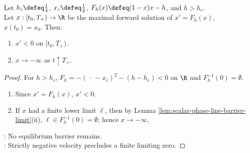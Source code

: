 \begin{theorem} \label{thm:supercritical-harvest-phase-line} \\
Let $h_c\defeq\frac14$, $x_c\defeq\frac12$, $F_h(x)\defeq(1-x)x-h$, and $h>h_c$.\\
Let $x:[t_0,T_+)\to\R$ be the maximal forward solution of $x'=F_h(x)$, $x(t_0)=x_0$. Then:
\begin{enumerate}[label=(\roman*)]
\setlength{\itemsep}{0pt}
\item $x'<0$ on $[t_0,T_+)$.
\item $x\to-\infty$ as $t\uparrow T_+$.
\end{enumerate}
\begin{proof}
For $h>h_c$, $F_h=-(\,\cdot\,-x_c)^2-(h-h_c)<0$ on $\R$ and $F_h^{-1}(0)=\emptyset$.
\begin{enumerate}[label=(\roman*)]
\setlength{\itemsep}{0pt}
\item Since $x'=F_h(x)$, $x'<0$.
\item If $x$ had a finite lower limit $\ell$, then by Lemma \ref{lem:scalar-phase-line-barrier-limit}(ii), $\ell\in F_h^{-1}(0)=\emptyset$; hence $x\to-\infty$.
\end{enumerate}
: No equilibrium barrier remains.\\
: Strictly negative velocity precludes a finite limiting zero.
\end{proof}
\end{theorem}

